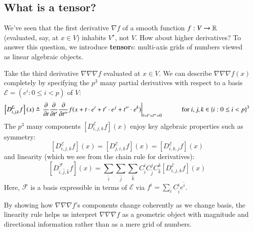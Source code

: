         \subsection{What is a tensor?}
            We've seen that the first derivative $\nabla f$ of a smooth function
            $f:V\to \mathbb{R}$ (evaluated, say, at $x\in V$) inhabits $V^\star$, not
            $V$.  How about higher derivatives?  To answer this question, we
            introduce \textbf{tensor}s: multi-axis grids of numbers viewed
            as linear algebraic objects.

            Take the third derivative $\nabla\nabla\nabla f$ evaluated at
            $x\in V$.  We can describe $\nabla\nabla\nabla f(x)$ completely by
            specifying the $p^3$ many partial derivatives with respect to a
            basis
            $\mathcal{E} = (e^i: 0\leq i<p)$ of $V$:
            $$ 
                \left[D_{i,j,k}^{\mathcal{E}} f\right](x)
                \triangleq 
                \left.
                \frac{\partial}{\partial t}
                \frac{\partial}{\partial t^{\prime}}
                \frac{\partial}{\partial t^{\prime\prime}}
                f(x + t                \cdot e^i
                    + t^{\prime}       \cdot e^j
                    + t^{\prime\prime} \cdot e^k)
                \right|_{t=t^\prime=t^{\prime\prime}=0}
                \hspace{1.0cm}
                \text{for $i,j,k\in \{i: 0\leq i<p\}^3$}
            $$
            The $p^3$ many components
            $
                \left[D_{i,j,k}^{\mathcal{E}} f\right](x)
            $
            enjoy key algebraic properties such as symmetry:
            $$
                \left[D_{i,j,k}^{\mathcal{E}} f\right](x)
                =
                \left[D_{j,i,k}^{\mathcal{E}} f\right](x)
                =
                \left[D_{i,k,j}^{\mathcal{E}} f\right](x)
            $$
            and linearity (which we see from the chain rule for derivatives):
            $$
                \left[D_{\hat i,\hat j,\hat k}^{\mathcal{F}} f\right](x)
                =
                \sum_{\hat i} 
                \sum_{\hat j}
                \sum_{\hat k}
                C_{\hat i}^i
                C_{\hat j}^j
                C_{\hat k}^k
                \left[D_{i,j,k}^{\mathcal{E}} f\right](x)
            $$
            Here, $\mathcal{F}$ is a basis expressible in terms of
            $\mathcal{E}$ via $f^i = \sum_{\hat i} C^i_{\hat i} e^{\hat i}$.

            By showing how $\nabla\nabla\nabla f$'s components change
            coherently as we change basis, the linearity rule helps us
            interpret $\nabla\nabla\nabla f$ as a geometric object with
            magnitude and directional information rather than as a mere grid of
            numbers.

